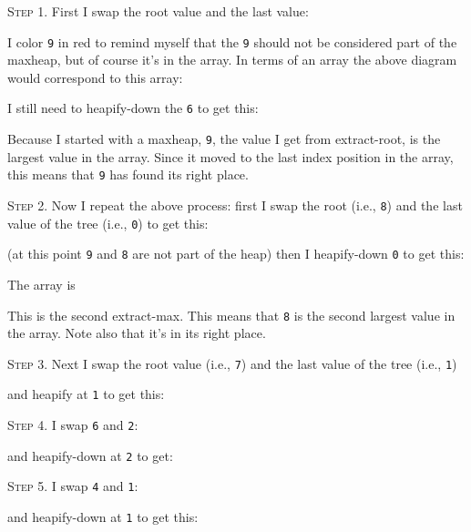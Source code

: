 \textsc{Step 1}.
First I swap the root value and the last value:




I color \texttt{9} in red to remind myself
that the \texttt{9} should not be considered part of the maxheap,
but of course it's in the array.
In terms of an array the above diagram would correspond to this array:



I still need to heapify-down the \texttt{6} to get this:




Because I started with a maxheap, \verb!9!, the value I get from extract-root,
is the largest value in the array.
Since it moved to the last index position in the array,
this means that \verb!9! has found its right place.


\textsc{Step 2}.
Now I repeat the above process:
first I swap the root (i.e., \texttt{8}) and
the last value of the tree (i.e., \texttt{0}) to get this:





(at this point \verb!9! and \verb!8! are not part of the heap)
then I heapify-down \texttt{0} to get this:



The array is



This is the second extract-max.
This means that \verb!8! is the second largest value in the array.
Note also that it's in its right place.


\textsc{Step 3}.
Next I swap the root value (i.e., \texttt{7}) and the last value
of the tree (i.e., \texttt{1})



and heapify at \texttt{1} to get this:




\textsc{Step 4}.
I swap \texttt{6} and \texttt{2}:



and heapify-down at \texttt{2} to get:





\textsc{Step 5}.
I swap \texttt{4} and \texttt{1}:



and heapify-down at \texttt{1} to get this:

